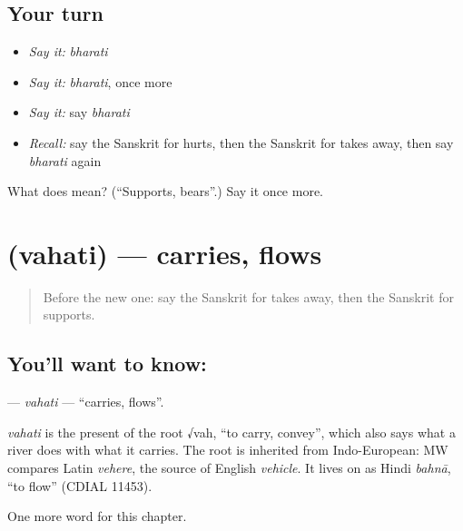 \subsection*{Your turn}
\begin{itemize}
\raggedright
  \item \emph{Say it:} \emph{bharati}
  \item \emph{Say it:} \emph{bharati}, once more
  \item \emph{Say it:} say \emph{bharati}
  \item \emph{Recall:} say the Sanskrit for hurts, then the Sanskrit for takes away, then say \emph{bharati} again
\end{itemize}

\begin{tcolorbox}[breakable,colback=teal!4,colframe=teal!35!black,title={Before you move on}]
What does  mean? (\textquotedblleft{}Supports, bears\textquotedblright{}.) Say it once more.
\end{tcolorbox}
\section[\texorpdfstring{\sk{वहति} (vahati)}{वहति (vahati)}]{ (vahati) — carries, flows}

\label{lesson:SA-C175-vahati}



\begin{quote}
Before the new one: say the Sanskrit for takes away, then the Sanskrit for supports.
\end{quote}

\subsection*{You'll want to know: }
\textbf{} — \emph{vahati} — \textquotedblleft{}carries, flows\textquotedblright{}.

\begin{cousinweb}
\emph{vahati} is the present of the root √vah, \textquotedblleft{}to carry, convey\textquotedblright{}, which also says what a river does with what it carries. The root is inherited from Indo-European: MW compares Latin \emph{vehere}, the source of English \emph{vehicle}. It lives on as Hindi \emph{bahnā}, \textquotedblleft{}to flow\textquotedblright{} (CDIAL 11453).
\end{cousinweb}

\begin{grammarlens}[title={What you've built}]
One more word for this chapter.
\end{grammarlens}

